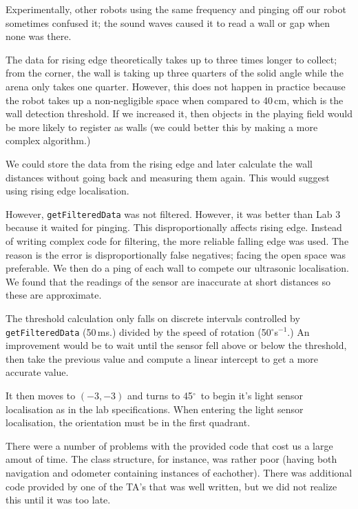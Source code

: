 \documentclass[twocolumn]{article}
\def\degree{\ensuremath{^\circ}}
\begin{document}
Experimentally, other robots using the same frequency and pinging off our robot sometimes confused it; the sound waves caused it to read a wall or gap when none was there.

The data for rising edge theoretically takes up to three times longer to collect; from the corner, the wall is taking up three quarters of the solid angle while the arena only takes one quarter. However, this does not happen in practice because the robot takes up a non-negligible space when compared to 40\,cm, which is the wall detection threshold. If we increased it, then objects in the playing field would be more likely to register as walls (we could better this by making a more complex algorithm.)

We could store the data from the rising edge and later calculate the wall distances without going back and measuring them again. This would suggest using rising edge localisation.

However, {\tt getFilteredData} was not filtered. However, it was better than Lab 3\cite{alexneil3} because it waited for pinging. This disproportionally affects rising edge. Instead of writing complex code for filtering, the more reliable falling edge was used. The reason is the error is disproportionally false negatives; facing the open space was preferable. We then do a ping of each wall to compete our ultrasonic localisation. We found that the readings of the sensor are inaccurate at short distances so these are approximate.

The threshold calculation only falls on discrete intervals controlled by {\tt getFilteredData} (50\,ms.) divided by the speed of rotation (50\degree s$^{-1}$.) An improvement would be to wait until the sensor fell above or below the threshold, then take the previous value and compute a linear intercept to get a more accurate value.

It then moves to $(-3, -3)$ and turns to 45\degree~to begin it's light sensor localisation as in the lab specifications\cite{lab4}. When entering the light sensor localisation, the orientation must be in the first quadrant.



There were a number of problems with the provided code that cost us a large amout of time. The class structure, for instance, was rather poor (having both navigation and odometer containing instances of eachother). There was additional code provided by one of the TA's that was well written, but we did not realize this until it was too late.
\end{document}

